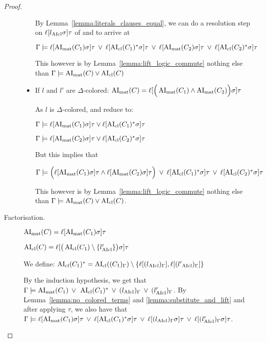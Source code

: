 \documentclass[,%
	paper=a4,%
	DIV14, %
	twoside=false,%
	liststotoc,
	bibtotoc,
	draft=false,%
	numbers=noendperiod
]{scrartcl}
\begin{document}
\begin{proof}
\begin{description}
\begin{itemize}
					By Lemma~\ref{lemma:literals_clauses_equal}, we can do a resolution step on $\ell[l_{\operatorname{AIcl}}\sigma]\tau$ of \markA{} and \markB{} to arrive at 

					$\Gamma \models \ell[\operatorname{AI}_\mathrm{mat}(C_1)\sigma]\tau \;\,{\lor}\;\, \ell[\operatorname{AI}_\mathrm{cl}(C_1)^*\sigma]\tau\;\,{\lor}\;\, 
					\ell[\operatorname{AI}_\mathrm{mat}(C_2)\sigma]\tau\;\,{\lor}\;\, \ell[\operatorname{AI}_\mathrm{cl}(C_2)^*\sigma]\tau $

					This however is by Lemma~\ref{lemma:lift_logic_commute} nothing else than
					$\Gamma \models \operatorname{AI}_\mathrm{mat}(C) \lor \operatorname{AI}_\mathrm{cl}(C)$

				\item If $l$ and $l'$ are $\Delta$-colored:
					$\operatorname{AI}_\mathrm{mat}(C) = \ell[\Big(\operatorname{AI}_\mathrm{mat}(C_1) \land \operatorname{AI}_\mathrm{mat}(C_2)\Big)\sigma] \tau$

					As $l$ is $\Delta$-colored, \markA{} and \markB{} reduce to:

					$\Gamma \models \ell[\operatorname{AI}_\mathrm{mat}(C_1)\sigma]\tau \lor \ell[\operatorname{AI}_\mathrm{cl}(C_1)^*\sigma]\tau$

					$\Gamma \models \ell[\operatorname{AI}_\mathrm{mat}(C_2)\sigma]\tau \lor \ell[\operatorname{AI}_\mathrm{cl}(C_2)^*\sigma]\tau$

					But this implies that 

					$\Gamma \models \Big(\ell[\operatorname{AI}_\mathrm{mat}(C_1)\sigma]\tau \land \ell[\operatorname{AI}_\mathrm{mat}(C_2)\sigma]\tau\Big) 
					\;\,{\lor}\;\, \ell[\operatorname{AI}_\mathrm{cl}(C_1)^*\sigma]\tau
					\;\,{\lor}\;\, \ell[\operatorname{AI}_\mathrm{cl}(C_2)^*\sigma]\tau$

					This however is by Lemma~\ref{lemma:lift_logic_commute} nothing else than 
					$\Gamma \models \operatorname{AI}_\mathrm{mat}(C) \lor \operatorname{AI}_\mathrm{cl}(C)$.
			\end{itemize}


		\item[Factorisation.]\hfill
			\begin{prooftree} 
			\end{prooftree} 

			$\operatorname{AI}_\mathrm{mat}(C) = \ell[\operatorname{AI}_\mathrm{mat}(C_1)\sigma]\tau$

			$\operatorname{AI}_\mathrm{cl}(C) = \ell[ \big(\operatorname{AI}_\mathrm{cl}(C_1) \setminus \{l'_{\operatorname{AIcl}}\}\big)\sigma]\tau$

			We define:
			$ \operatorname{AI}_\mathrm{cl}(C_1)^* = \operatorname{AI}_\mathrm{cl}((C_1)_\Gamma) \setminus \{\ell[(l{_{\operatorname{AIcl}}})_\Gamma], \ell[(l'{_{\operatorname{AIcl}}})_\Gamma]\}$

			By the induction hypothesis, we get that 
			$\Gamma \models \operatorname{AI}_\mathrm{mat}(C_1) \;\,{\lor}\;\, \operatorname{AI}_\mathrm{cl}(C_1)^* \;\,{\lor}\;\, (l_{\operatorname{AIcl}})_\Gamma \;\,{\lor}\;\, (l'_{\operatorname{AIcl}})_\Gamma $.
			By Lemma~\ref{lemma:no_colored_terms} and \ref{lemma:substitute_and_lift} and after applying $\tau$, we also have that
			$\Gamma \models \ell[\operatorname{AI}_\mathrm{mat}(C_1)\sigma]\tau \;\,{\lor}\;\,\allowbreak \ell[\operatorname{AI}_\mathrm{cl}(C_1)^*\sigma]\tau \;\,{\lor}\;\,\allowbreak \ell[(l_{\operatorname{AIcl}})_\Gamma\sigma]\tau \;\,{\lor}\;\,\allowbreak \ell[(l'_{\operatorname{AIcl}})_\Gamma\sigma]\tau $.


\end{description}
\end{proof}
\end{document}
